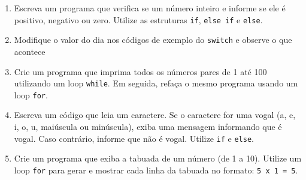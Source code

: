 \begin{enumerate}
    \item {Escreva um programa que verifica se um número inteiro e informe se ele é 
        positivo, negativo ou zero. Utilize as estruturas \texttt{if}, 
        \texttt{else if} e \texttt{else}.}
    \item {Modifique o valor do dia nos códigos de exemplo do \texttt{switch} e 
        observe o que acontece}
    \item {Crie um programa que imprima todos os números pares de 1 até 100 
        utilizando um loop \texttt{while}. Em seguida, refaça o mesmo programa 
        usando um loop \texttt{for}.}
    \item {Escreva um código que leia um caractere. Se o caractere for uma vogal 
        (a, e, i, o, u, maiúscula ou minúscula), exiba uma mensagem informando 
        que é vogal. Caso contrário, informe que não é vogal. Utilize \texttt{if} 
        e \texttt{else}.}
    \item {Crie um programa que exiba a tabuada de um número (de 1 a 10). Utilize 
        um loop \texttt{for} para gerar e mostrar cada linha da tabuada no formato: 
        \texttt{5 x 1 = 5}.}
\end{enumerate}

